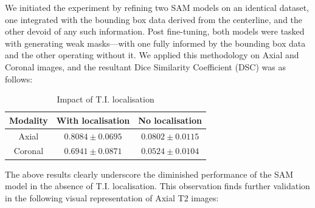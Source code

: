 We initiated the experiment by refining two SAM models on an identical dataset, one integrated with the bounding box data derived from the centerline, and the other devoid of any such information. Post fine-tuning, both models were tasked with generating weak masks—with one fully informed by the bounding box data and the other operating without it. We applied this methodology on Axial and Coronal images, and the resultant Dice Similarity Coefficient (DSC) was as follows:

\begin{table}[ht]
\centering
\begin{tabular}{c|c|c}
Modality & With localisation & No localisation \\
\hline
Axial & \(0.8084 \pm 0.0695\) & \(0.0802 \pm 0.0115\)\\
\hline
Coronal & \(0.6941 \pm 0.0871\) & \(0.0524 \pm 0.0104\)
\end{tabular}
\caption{Impact of T.I. localisation}
\end{table}

The above results clearly underscore the diminished performance of the SAM model in the absence of T.I. localisation. This observation finds further validation in the following visual representation of Axial T2 images:

